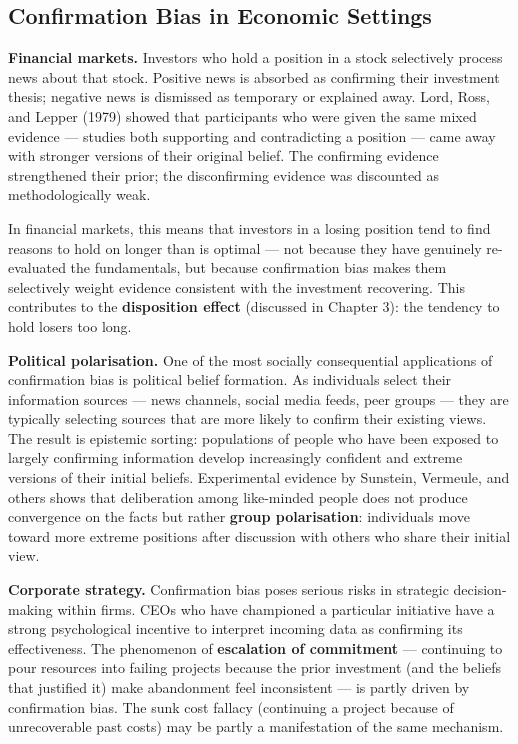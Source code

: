 \documentclass[12pt, letterpaper]{article}
\begin{document}
\subsection{Confirmation Bias in Economic Settings}


\textbf{Financial markets.} Investors who hold a position in a stock selectively process news about that stock. Positive news is absorbed as confirming their investment thesis; negative news is dismissed as temporary or explained away. Lord, Ross, and Lepper (1979) showed that participants who were given the same mixed evidence --- studies both supporting and contradicting a position --- came away with stronger versions of their original belief. The confirming evidence strengthened their prior; the disconfirming evidence was discounted as methodologically weak.

In financial markets, this means that investors in a losing position tend to find reasons to hold on longer than is optimal --- not because they have genuinely re-evaluated the fundamentals, but because confirmation bias makes them selectively weight evidence consistent with the investment recovering. This contributes to the \textbf{disposition effect} (discussed in Chapter 3): the tendency to hold losers too long.

\textbf{Political polarisation.} One of the most socially consequential applications of confirmation bias is political belief formation. As individuals select their information sources --- news channels, social media feeds, peer groups --- they are typically selecting sources that are more likely to confirm their existing views. The result is epistemic sorting: populations of people who have been exposed to largely confirming information develop increasingly confident and extreme versions of their initial beliefs. Experimental evidence by Sunstein, Vermeule, and others shows that deliberation among like-minded people does not produce convergence on the facts but rather \textbf{group polarisation}: individuals move toward more extreme positions after discussion with others who share their initial view.

\textbf{Corporate strategy.} Confirmation bias poses serious risks in strategic decision-making within firms. CEOs who have championed a particular initiative have a strong psychological incentive to interpret incoming data as confirming its effectiveness. The phenomenon of \textbf{escalation of commitment} --- continuing to pour resources into failing projects because the prior investment (and the beliefs that justified it) make abandonment feel inconsistent --- is partly driven by confirmation bias. The sunk cost fallacy (continuing a project because of unrecoverable past costs) may be partly a manifestation of the same mechanism.
\end{document}
